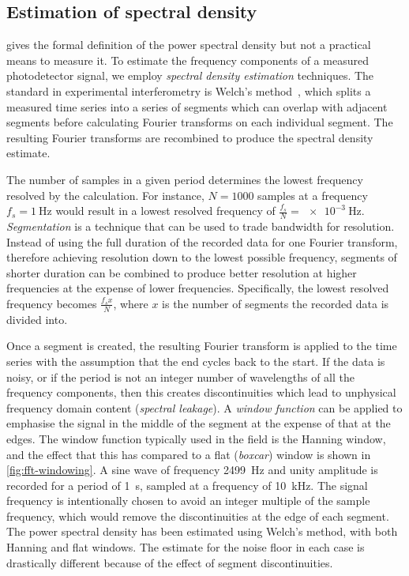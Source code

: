 \subsection{\label{sec:windowing}Estimation of spectral density}
 gives the formal definition of the power spectral density but not a practical means to measure it. To estimate the frequency components of a measured photodetector signal, we employ \emph{spectral density estimation} techniques. The standard in experimental interferometry is Welch's method~\cite{Welch1967}, which splits a measured time series into a series of segments which can overlap with adjacent segments before calculating Fourier transforms on each individual segment. The resulting Fourier transforms are recombined to produce the spectral density estimate.

The number of samples in a given period determines the lowest frequency resolved by the calculation. For instance, $N = \num{1000}$ samples at a frequency $f_s = \SI{1}{\hertz}$ would result in a lowest resolved frequency of $\frac{f_s}{N} = \SI{e-3}{\hertz}$. \emph{Segmentation} is a technique that can be used to trade bandwidth for resolution. Instead of using the full duration of the recorded data for one Fourier transform, therefore achieving resolution down to the lowest possible frequency, segments of shorter duration can be combined to produce better resolution at higher frequencies at the expense of lower frequencies. Specifically, the lowest resolved frequency becomes $\frac{f_s x}{N}$, where $x$ is the number of segments the recorded data is divided into.

Once a segment is created, the resulting Fourier transform is applied to the time series with the assumption that the end cycles back to the start. If the data is noisy, or if the period is not an integer number of wavelengths of all the frequency components, then this creates discontinuities which lead to unphysical frequency domain content (\emph{spectral leakage}). A \emph{window function} can be applied to emphasise the signal in the middle of the segment at the expense of that at the edges. The window function typically used in the field is the Hanning window, and the effect that this has compared to a flat (\emph{boxcar}) window is shown in \cref{fig:fft-windowing}. A sine wave of frequency \SI{2499}{\hertz} and unity amplitude is recorded for a period of \SI{1}{\second}, sampled at a frequency of \SI{10}{\kilo\hertz}. The signal frequency is intentionally chosen to avoid an integer multiple of the sample frequency, which would remove the discontinuities at the edge of each segment. The power spectral density has been estimated using Welch's method, with both Hanning and flat windows. The estimate for the noise floor in each case is drastically different because of the effect of segment discontinuities.

